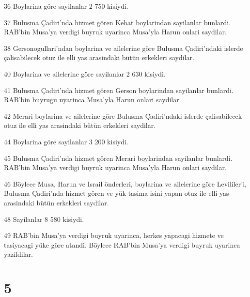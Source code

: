 \par 36 Boylarina göre sayilanlar 2 750 kisiydi.
\par 37 Bulusma Çadiri'nda hizmet gören Kehat boylarindan sayilanlar bunlardi. RAB'bin Musa'ya verdigi buyruk uyarinca Musa'yla Harun onlari saydilar.
\par 38 Gersonogullari'ndan boylarina ve ailelerine göre Bulusma Çadiri'ndaki islerde çalisabilecek otuz ile elli yas arasindaki bütün erkekleri saydilar.
\par 40 Boylarina ve ailelerine göre sayilanlar 2 630 kisiydi.
\par 41 Bulusma Çadiri'nda hizmet gören Gerson boylarindan sayilanlar bunlardi. RAB'bin buyrugu uyarinca Musa'yla Harun onlari saydilar.
\par 42 Merari boylarina ve ailelerine göre Bulusma Çadiri'ndaki islerde çalisabilecek otuz ile elli yas arasindaki bütün erkekleri saydilar.
\par 44 Boylarina göre sayilanlar 3 200 kisiydi.
\par 45 Bulusma Çadiri'nda hizmet gören Merari boylarindan sayilanlar bunlardi. RAB'bin Musa'ya verdigi buyruk uyarinca Musa'yla Harun onlari saydilar.
\par 46 Böylece Musa, Harun ve Israil önderleri, boylarina ve ailelerine göre Levililer'i, Bulusma Çadiri'nda hizmet gören ve yük tasima isini yapan otuz ile elli yas arasindaki bütün erkekleri saydilar.
\par 48 Sayilanlar 8 580 kisiydi.
\par 49 RAB'bin Musa'ya verdigi buyruk uyarinca, herkes yapacagi hizmete ve tasiyacagi yüke göre atandi. Böylece RAB'bin Musa'ya verdigi buyruk uyarinca yazildilar.

\chapter{5}

